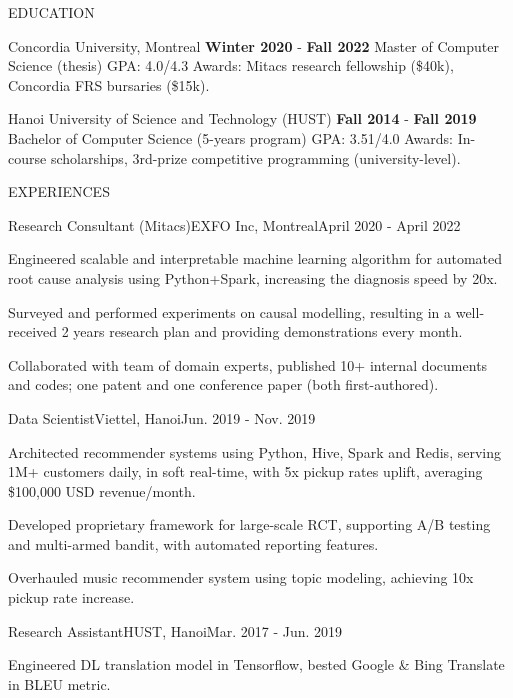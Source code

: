 \documentclass{resume} %
\begin{document}
\begin{rSection}{EDUCATION}
\begin{rSchool}{Concordia University, Montreal}
  {\textbf{Winter 2020} - \textbf{Fall 2022}}
  {Master of Computer Science ({thesis})}
  {GPA: 4.0/4.3}
  {Awards: Mitacs research fellowship (\$40k), Concordia FRS bursaries (\$15k).}
\end{rSchool}
%
\begin{rSchool}{Hanoi University of Science and Technology (HUST)}
  {\textbf{Fall 2014} - \textbf{Fall 2019}}
  {Bachelor of Computer Science ({5-years program})}
  {GPA: 3.51/4.0}
  {Awards: In-course scholarships, 3rd-prize competitive programming ({university-level}).}
\end{rSchool}
\end{rSection}
\begin{rSection}{EXPERIENCES}
  \begin{rWork}{Research Consultant (Mitacs)}{EXFO Inc, Montreal}{April 2020 - April 2022}
    \item Engineered scalable and interpretable machine learning algorithm for automated root cause analysis using Python+Spark, increasing the diagnosis speed by 20x.
    \item Surveyed and performed experiments on causal modelling, resulting in a well-received 2 years research plan and providing demonstrations every month.
    \item Collaborated with team of domain experts, published 10+ internal documents and codes; one patent and one conference paper (both first-authored).
  \end{rWork}
  \begin{rWork}{Data Scientist}{Viettel, Hanoi}{Jun. 2019 - Nov. 2019}
    \item Architected recommender systems using Python, Hive, Spark and Redis, serving 1M+ customers daily, in soft real-time, with 5x pickup rates uplift, averaging \$100,000 USD revenue/month.
    \item Developed proprietary framework for large-scale RCT, supporting A/B testing and multi-armed bandit, with automated reporting features.
    \item Overhauled music recommender system using topic modeling, achieving 10x pickup rate increase.
  \end{rWork}
  \begin{rWork}{Research Assistant}{HUST, Hanoi}{Mar. 2017 - Jun. 2019}
    \item Engineered DL translation model in Tensorflow, bested Google \& Bing Translate in BLEU metric.

\end{rWork}
\end{rSection}
\end{document}
